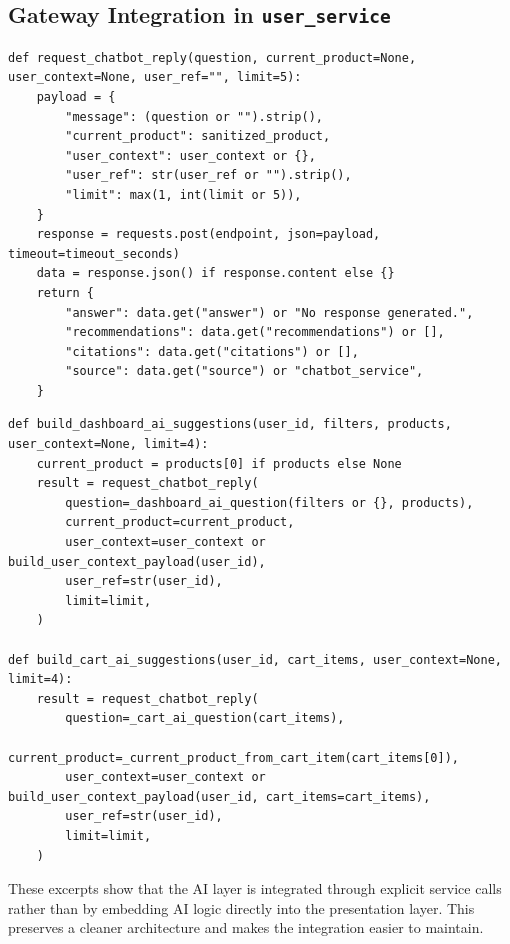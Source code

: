 \documentclass[12pt,a4paper]{article}
\begin{document}
\subsection{Gateway Integration in \texttt{user\_service}}
\begin{lstlisting}[caption={Gateway call from \texttt{user\_service} to \texttt{chatbot\_service}}]
def request_chatbot_reply(question, current_product=None, user_context=None, user_ref="", limit=5):
    payload = {
        "message": (question or "").strip(),
        "current_product": sanitized_product,
        "user_context": user_context or {},
        "user_ref": str(user_ref or "").strip(),
        "limit": max(1, int(limit or 5)),
    }
    response = requests.post(endpoint, json=payload, timeout=timeout_seconds)
    data = response.json() if response.content else {}
    return {
        "answer": data.get("answer") or "No response generated.",
        "recommendations": data.get("recommendations") or [],
        "citations": data.get("citations") or [],
        "source": data.get("source") or "chatbot_service",
    }
\end{lstlisting}

\begin{lstlisting}[caption={Dashboard and cart AI suggestion builders}]
def build_dashboard_ai_suggestions(user_id, filters, products, user_context=None, limit=4):
    current_product = products[0] if products else None
    result = request_chatbot_reply(
        question=_dashboard_ai_question(filters or {}, products),
        current_product=current_product,
        user_context=user_context or build_user_context_payload(user_id),
        user_ref=str(user_id),
        limit=limit,
    )

def build_cart_ai_suggestions(user_id, cart_items, user_context=None, limit=4):
    result = request_chatbot_reply(
        question=_cart_ai_question(cart_items),
        current_product=_current_product_from_cart_item(cart_items[0]),
        user_context=user_context or build_user_context_payload(user_id, cart_items=cart_items),
        user_ref=str(user_id),
        limit=limit,
    )
\end{lstlisting}

These excerpts show that the AI layer is integrated through explicit service calls rather than by embedding AI logic directly into the presentation layer. This preserves a cleaner architecture and makes the integration easier to maintain.
\end{document}
